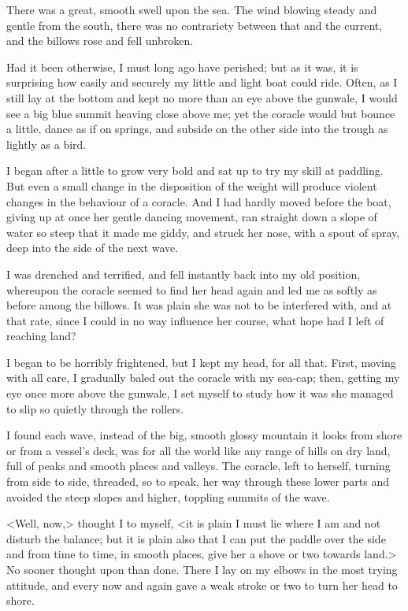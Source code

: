 There was a great, smooth swell upon the sea. The wind blowing steady and gentle from the south, there was no contrariety between that and the current, and the billows rose and fell unbroken.

Had it been otherwise, I must long ago have perished; but as it was, it is surprising how easily and securely my little and light boat could ride. Often, as I still lay at the bottom and kept no more than an eye above the gunwale, I would see a big blue summit heaving close above me; yet the coracle would but bounce a little, dance as if on springs, and subside on the other side into the trough as lightly as a bird.

I began after a little to grow very bold and sat up to try my skill at paddling. But even a small change in the disposition of the weight will produce violent changes in the behaviour of a coracle. And I had hardly moved before the boat, giving up at once her gentle dancing movement, ran straight down a slope of water so steep that it made me giddy, and struck her nose, with a spout of spray, deep into the side of the next wave.

I was drenched and terrified, and fell instantly back into my old position, whereupon the coracle seemed to find her head again and led me as softly as before among the billows. It was plain she was not to be interfered with, and at that rate, since I could in no way influence her course, what hope had I left of reaching land?

I began to be horribly frightened, but I kept my head, for all that. First, moving with all care, I gradually baled out the coracle with my sea-cap; then, getting my eye once more above the gunwale, I set myself to study how it was she managed to slip so quietly through the rollers.

I found each wave, instead of the big, smooth glossy mountain it looks from shore or from a vessel's deck, was for all the world like any range of hills on dry land, full of peaks and smooth places and valleys. The coracle, left to herself, turning from side to side, threaded, so to speak, her way through these lower parts and avoided the steep slopes and higher, toppling summits of the wave.

<Well, now,> thought I to myself, <it is plain I must lie where I am and not disturb the balance; but it is plain also that I can put the paddle over the side and from time to time, in smooth places, give her a shove or two towards land.> No sooner thought upon than done. There I lay on my elbows in the most trying attitude, and every now and again gave a weak stroke or two to turn her head to shore.

